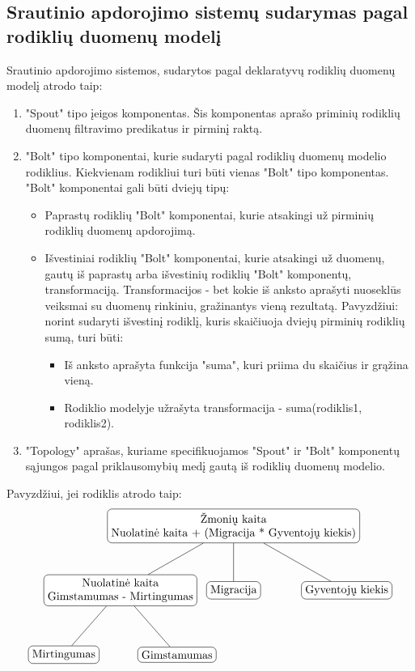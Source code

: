 \documentclass{VUMIFPSbakalaurinis}
\begin{document}
\subsection{Srautinio apdorojimo sistemų sudarymas pagal rodiklių duomenų modelį}
Srautinio apdorojimo sistemos, sudarytos pagal deklaratyvų rodiklių duomenų modelį atrodo taip:
\begin{enumerate}
    \item "Spout" tipo įeigos komponentas. Šis komponentas aprašo priminių rodiklių duomenų filtravimo predikatus ir pirminį raktą. 
    \item "Bolt" tipo komponentai, kurie sudaryti pagal rodiklių duomenų modelio rodiklius. Kiekvienam rodikliui turi būti vienas "Bolt" tipo komponentas. "Bolt" komponentai gali būti dviejų tipų:
    \begin{itemize}
        \item Paprastų rodiklių "Bolt" komponentai, kurie atsakingi už pirminių rodiklių duomenų apdorojimą.
        \item Išvestiniai rodiklių "Bolt" komponentai, kurie atsakingi už duomenų, gautų iš paprastų arba išvestinių rodiklių "Bolt" komponentų, transformaciją. Transformacijos - bet kokie iš anksto aprašyti nuoseklūs veiksmai su duomenų rinkiniu, gražinantys vieną rezultatą. Pavyzdžiui: norint sudaryti išvestinį rodiklį, kuris skaičiuoja dviejų pirminių rodiklių sumą, turi būti:
        \begin{itemize}
            \item Iš anksto aprašyta funkcija "suma", kuri priima du skaičius ir grąžina vieną.
            \item Rodiklio modelyje užrašyta transformacija - suma(rodiklis1, rodiklis2).
        \end{itemize} 
    \end{itemize}
    \item "Topology" aprašas, kuriame specifikuojamos "Spout" ir "Bolt" komponentų sąjungos pagal priklausomybių medį gautą iš rodiklių duomenų modelio.
\end{enumerate}\par
Pavyzdžiui, jei rodiklis atrodo taip:     
\[
    \begin{tikzpicture}[sibling distance=10em,
        level distance=2cm,
        every node/.style = {shape=rectangle, rounded corners,	
                             draw, align=center,	
                             top color=white, bottom color=white}]	
        \node{Žmonių kaita\\Nuolatinė kaita + (Migracija * Gyventojų kiekis)}
                child { node {Nuolatinė kaita\\Gimstamumas - Mirtingumas} 
                        child {node {Mirtingumas}}
                        child {node {Gimstamumas}} }	
                child { node {Migracija} } 	
                child { node {Gyventojų kiekis} }; 	
    \end{tikzpicture} 	
\]\par
\end{document}
